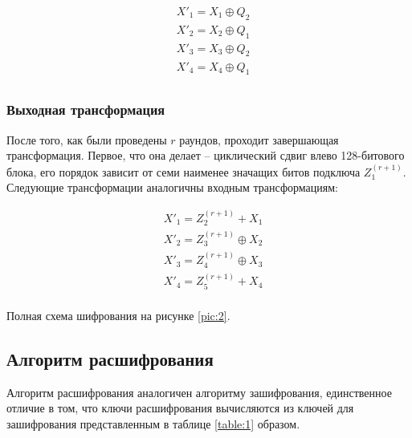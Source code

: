 \documentclass[12pt, a4paper]{article}
\begin{document}
\begin{equation}
\begin{split}
& X'_1 = X_1 \oplus Q_2 \\
& X'_2 = X_2 \oplus Q_1 \\
& X'_3 = X_3 \oplus Q_2 \\
& X'_4 = X_4 \oplus Q_1 \\
\end{split}
\end{equation}

\subsubsection{Выходная трансформация}

После того, как были проведены $r$ раундов, проходит завершающая трансформация. Первое, что она делает -- циклический сдвиг влево 128-битового блока, его порядок зависит от семи наименее значащих битов подключа $Z_1^{(r+1)}$. Следующие трансформации аналогичны входным трансформациям: 

\begin{equation}
\begin{split}
& X'_1 = Z_2^{(r+1)} + X_1 \\
& X'_2 = Z_3^{(r+1)} \oplus X_2 \\
& X'_3 = Z_4^{(r+1)} \oplus X_3 \\
& X'_4 = Z_5^{(r+1)} + X_4 \\
\end{split}
\end{equation}

Полная схема шифрования на рисунке \ref{pic:2}.

\subsection{Алгоритм расшифрования}

Алгоритм расшифрования аналогичен алгоритму зашифрования, единственное отличие в том, что ключи расшифрования вычисляются из ключей для зашифрования представленным в таблице \ref{table:1} образом.
\end{document}
